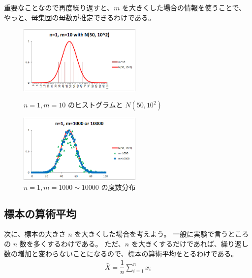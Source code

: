 \documentclass[uplatex,11pt,a4paper]{jsarticle}
\begin{document}
重要なことなので再度繰り返すと、$m$ を大きくした場合の情報を使うことで、やっと、母集団の母数が推定できるわけである。
\begin{figure}[htb]
\begin{minipage}{0.5\hsize}
 \centering
	\includegraphics[width=6cm]{./figs/n1m10.png}
	\caption{$n=1, m=10$ のヒストグラムと $N(50, 10^2)$ }
	\label{fig: m10}
\end{minipage}
\begin{minipage}{0.5\hsize}
 \centering
	\includegraphics[width=6cm]{./figs/n1m1000_10000.png}
	\caption{$n=1, m=1000 \sim 10000$ の度数分布 }
	\label{fig: m10000}
\end{minipage}
\end{figure}

\subsection{標本の算術平均}

次に、標本の大きさ $n$ を大きくした場合を考えよう。
一般に実験で言うところの $n$ 数を多くするわけである。
ただ、$n$ を大きくするだけであれば、繰り返し数の増加と変わらないことになるので、標本の算術平均をとるわけである。
\begin{align*}
\bar{X} = \dfrac{1}{n} \sum_{i=1}^n x_i
\end{align*}
\end{document}
